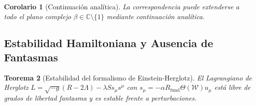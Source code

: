 \documentclass[11pt, a4paper]{article}
\theoremstyle{plain}
\newtheorem{teorema}{Teorema}[section]
\newtheorem{corolario}[teorema]{Corolario}
\theoremstyle{definition}
\newcommand{\Rfactor}{R_{\text{fund}}}
\begin{document}
\begin{corolario}[Continuación analítica]
La correspondencia puede extenderse a todo el plano complejo $\beta \in \mathbb{C} \setminus \{1\}$ mediante continuación analítica.
\end{corolario}

\subsection{Estabilidad Hamiltoniana y Ausencia de Fantasmas}
\label{app:estabilidad}

\begin{teorema}[Estabilidad del formalismo de Einstein-Herglotz]
El Lagrangiano de Herglotz $L = \sqrt{-g}(R - 2\Lambda) - \lambda S s_\mu s^\mu$ con $s_\mu = -\alpha \Rfactor \Theta(\mathcal{W}) u_\mu$ está libre de grados de libertad fantasma y es estable frente a perturbaciones.
\end{teorema}
\end{document}
